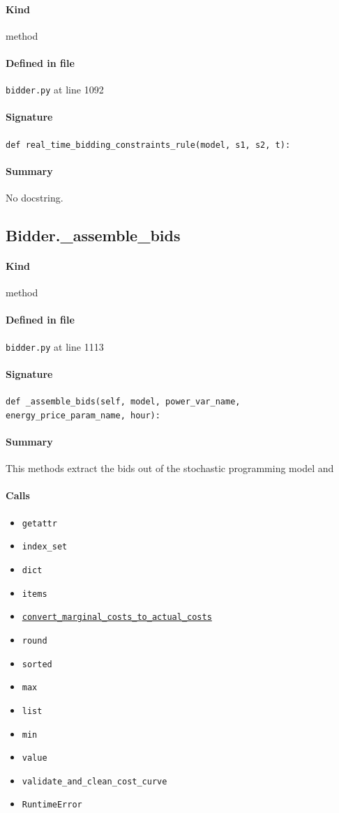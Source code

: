\documentclass[11pt]{report}
\begin{document}
\paragraph{Kind} method
\paragraph{Defined in file} \texttt{bidder.py} at line 1092
\paragraph{Signature} \texttt{def real\_time\_bidding\_constraints\_rule(model, s1, s2, t):}
\paragraph{Summary} No docstring.
\subsection{Bidder.\_assemble\_bids}
\label{def:bidder.py:Bidder._assemble_bids:L1113}
\paragraph{Kind} method
\paragraph{Defined in file} \texttt{bidder.py} at line 1113
\paragraph{Signature} \texttt{def \_assemble\_bids(self, model, power\_var\_name, energy\_price\_param\_name, hour):}
\paragraph{Summary} This methods extract the bids out of the stochastic programming model and
\paragraph{Calls}
\begin{itemize}[leftmargin=*]
  \item \texttt{getattr}
  \item \texttt{index\_set}
  \item \texttt{dict}
  \item \texttt{items}
  \item \hyperref[def:utils.py:convert_marginal_costs_to_actual_costs:L15]{\texttt{convert\_marginal\_costs\_to\_actual\_costs}}
  \item \texttt{round}
  \item \texttt{sorted}
  \item \texttt{max}
  \item \texttt{list}
  \item \texttt{min}
  \item \texttt{value}
  \item \texttt{validate\_and\_clean\_cost\_curve}
  \item \texttt{RuntimeError}
\end{itemize}
\end{document}
